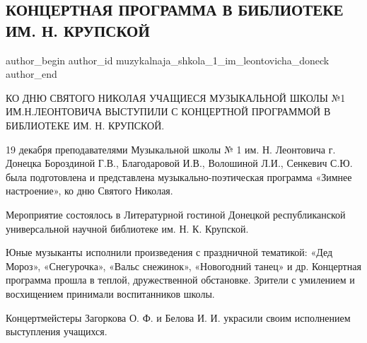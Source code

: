  
 
 
 
 
\subsection{КОНЦЕРТНАЯ ПРОГРАММА В БИБЛИОТЕКЕ ИМ. Н. КРУПСКОЙ}
\label{sec:24_12_2021.vk.muzykalnaja_shkola_1_im_leontovicha_doneck.1.koncert_biblioteka_krupskoj}

\ifcmt
 author_begin
   author_id muzykalnaja_shkola_1_im_leontovicha_doneck
 author_end
\fi

КО ДНЮ СВЯТОГО НИКОЛАЯ УЧАЩИЕСЯ МУЗЫКАЛЬНОЙ ШКОЛЫ №1 ИМ.Н.ЛЕОНТОВИЧА ВЫСТУПИЛИ
С КОНЦЕРТНОЙ ПРОГРАММОЙ В БИБЛИОТЕКЕ ИМ. Н. КРУПСКОЙ.


19 декабря преподавателями Музыкальной школы № 1 им. Н. Леонтовича г. Донецка
Бороздиной Г.В., Благодаровой И.В., Волошиной Л.И., Сенкевич С.Ю. была
подготовлена и представлена музыкально-поэтическая программа «Зимнее
настроение», ко дню Святого Николая.


Мероприятие состоялось в Литературной гостиной Донецкой республиканской
универсальной научной библиотеке им. Н. К. Крупской.

Юные музыканты исполнили произведения с праздничной тематикой: «Дед Мороз»,
«Снегурочка», «Вальс снежинок», «Новогодний танец» и др. Концертная программа
прошла в теплой, дружественной обстановке. Зрители с умилением и восхищением
принимали воспитанников школы.

Концертмейстеры Загоркова О. Ф. и Белова И. И. украсили своим исполнением
выступления учащихся.
